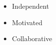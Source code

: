 %
%
%

\twocolumnsection
{
\begin{skills}
\end{skills}}
{
\vspace{1em}
\begin{itemize}
	\item Independent
	\item Motivated                    
    \item Collaborative
\end{itemize}
}
